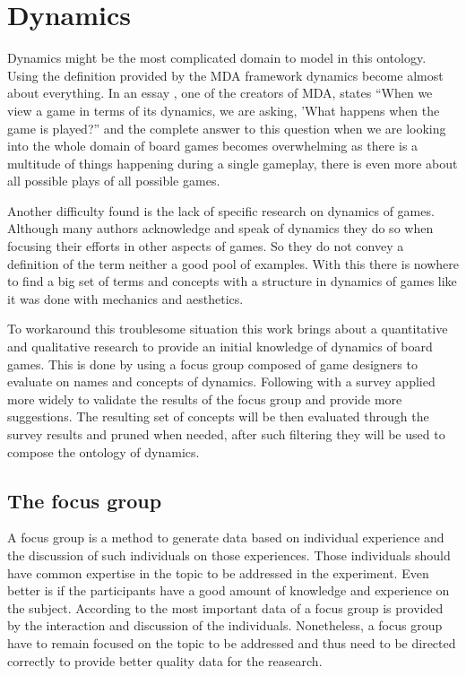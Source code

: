 \section{Dynamics}

Dynamics might be the most complicated domain to model in this ontology. Using the definition provided by the MDA framework dynamics become almost about everything. In an essay \cite{leblanc2006tools}, one of the creators of MDA, states ``When we view a game in terms of its dynamics, we are asking, 'What happens when the game is played?'' and the complete answer to this question when we are looking into the whole domain of board games becomes overwhelming as there is a multitude of things happening during a single gameplay, there is even more about all possible plays of all possible games. 

Another difficulty found is the lack of specific research on dynamics of games. Although many authors acknowledge and speak of dynamics they do so when focusing their efforts in other aspects of games. So they do not convey a definition of the term neither a good pool of examples. With this there is nowhere to find a big set of terms and concepts with a structure in dynamics of games like it was done with mechanics and aesthetics.

To workaround this troublesome situation this work brings about a quantitative and qualitative research to provide an initial knowledge of dynamics of board games. This is done by using a focus group composed of game designers to evaluate on names and concepts of dynamics. Following with a survey applied more widely to validate the results of the focus group and provide more suggestions. The resulting set of concepts will be then evaluated through the survey results and pruned when needed, after such filtering they will be used to compose the ontology of dynamics.

\subsection{The focus group}

A focus group is a method to generate data based on individual experience and the discussion of such individuals on those experiences. Those individuals should have common expertise in the topic to be addressed in the experiment. Even better is if the participants have a good amount of knowledge and experience on the subject. According to \cite{jenny_methodologyfocusgroup_1994} the most important data of a focus group is provided by the interaction and discussion of the individuals. Nonetheless, a focus group have to remain focused on the topic to be addressed and thus need to be directed correctly to provide better quality data for the reasearch. \citep{liamputtong_focusgroup_2011,rabiee_focus-group_2004,jenny_methodologyfocusgroup_1994}


